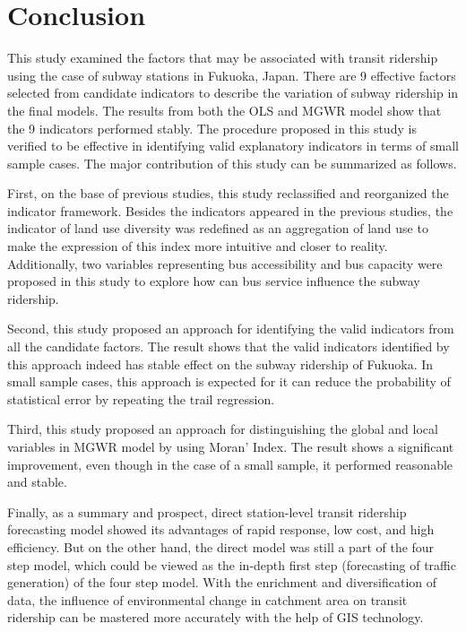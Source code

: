 \section{Conclusion}
%
This study examined the factors that may be associated with transit ridership using the case of subway stations in Fukuoka, Japan. There are 9 effective factors selected from candidate indicators to describe the variation of subway ridership in the final models. The results from both the OLS and MGWR model show that the 9 indicators performed stably. The procedure proposed in this study is verified to be effective in identifying valid explanatory indicators in terms of small sample cases. The major contribution of this study can be summarized as follows.

%
First, on the base of previous studies, this study reclassified and reorganized the indicator framework. Besides the indicators appeared in the previous studies, the indicator of land use diversity was redefined as an aggregation of land use to make the expression of this index more intuitive and closer to reality. Additionally, two variables representing bus accessibility and bus capacity were proposed in this study to explore how can bus service influence the subway ridership.

%
Second, this study proposed an approach for identifying the valid indicators from all the candidate factors. The result shows that the valid indicators identified by this approach indeed has stable effect on the subway ridership of Fukuoka. In small sample cases, this approach is expected for it can reduce the probability of statistical error by repeating the trail regression.

%
Third, this study proposed an approach for distinguishing the global and local variables in MGWR model by using Moran’ Index. The result shows a significant improvement, even though in the case of a small sample, it performed reasonable and stable.

%
Finally, as a summary and prospect, direct station-level transit ridership forecasting model showed its advantages of rapid response, low cost, and high efficiency. But on the other hand, the direct model was still a part of the four step model, which could be viewed as the in-depth first step (forecasting of traffic generation) of the four step model. With the enrichment and diversification of data, the influence of environmental change in catchment area on transit ridership can be mastered more accurately with the help of GIS technology.

\clearpage %

% 
